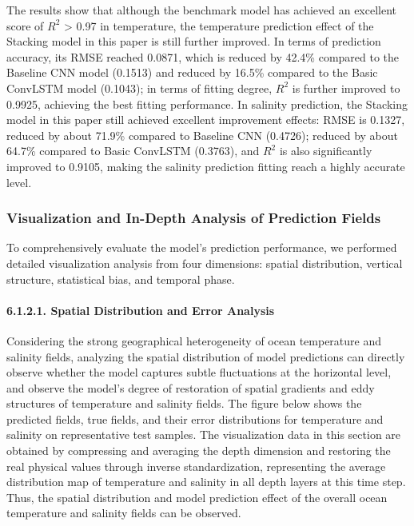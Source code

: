 \documentclass[webpdf,contemporary,large]{oup-authoring-template}
\begin{document}
The results show that although the benchmark model has achieved an excellent score of $R^2$ > 0.97 in temperature, the temperature prediction effect of the Stacking model in this paper is still further improved. In terms of prediction accuracy, its RMSE reached 0.0871, which is reduced by 42.4\% compared to the Baseline CNN model (0.1513) and reduced by 16.5\% compared to the Basic ConvLSTM model (0.1043); in terms of fitting degree, $R^2$ is further improved to 0.9925, achieving the best fitting performance. In salinity prediction, the Stacking model in this paper still achieved excellent improvement effects: RMSE is 0.1327, reduced by about 71.9\% compared to Baseline CNN (0.4726); reduced by about 64.7\% compared to Basic ConvLSTM (0.3763), and $R^2$ is also significantly improved to 0.9105, making the salinity prediction fitting reach a highly accurate level.

\subsubsection{Visualization and In-Depth Analysis of Prediction Fields}

To comprehensively evaluate the model's prediction performance, we performed detailed visualization analysis from four dimensions: spatial distribution, vertical structure, statistical bias, and temporal phase.

\paragraph{6.1.2.1. Spatial Distribution and Error Analysis}

Considering the strong geographical heterogeneity of ocean temperature and salinity fields, analyzing the spatial distribution of model predictions can directly observe whether the model captures subtle fluctuations at the horizontal level, and observe the model's degree of restoration of spatial gradients and eddy structures of temperature and salinity fields. The figure below shows the predicted fields, true fields, and their error distributions for temperature and salinity on representative test samples. The visualization data in this section are obtained by compressing and averaging the depth dimension and restoring the real physical values through inverse standardization, representing the average distribution map of temperature and salinity in all depth layers at this time step. Thus, the spatial distribution and model prediction effect of the overall ocean temperature and salinity fields can be observed.
\end{document}
